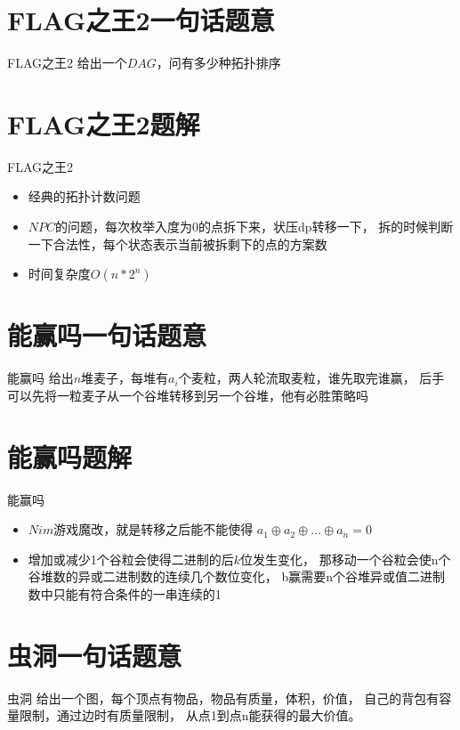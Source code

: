 \documentclass{beamer}
\begin{document}
\section{FLAG之王2一句话题意}
\begin{frame} {FLAG之王2}
  给出一个$DAG$，问有多少种拓扑排序
\end{frame}
\section{FLAG之王2题解}
\begin{frame} {FLAG之王2}
\begin{itemize}
  \item 经典的拓扑计数问题
  \item $NPC$的问题，每次枚举入度为0的点拆下来，状压dp转移一下，
  拆的时候判断一下合法性，每个状态表示当前被拆剩下的点的方案数
  \item 时间复杂度$O(n*2^n)$
\end{itemize}
\end{frame}

\section{能赢吗一句话题意}
\begin{frame} {能赢吗}
  给出$n$堆麦子，每堆有$a_i$个麦粒，两人轮流取麦粒，谁先取完谁赢，
  后手可以先将一粒麦子从一个谷堆转移到另一个谷堆，他有必胜策略吗
\end{frame}
\section{能赢吗题解}
\begin{frame} {能赢吗}
\begin{itemize}
  \item $Nim$游戏魔改，就是转移之后能不能使得
  $a_1 \oplus a_2 \oplus ... \oplus a_n =0$
  \item 增加或减少1个谷粒会使得二进制的后$k$位发生变化，
  那移动一个谷粒会使n个谷堆数的异或二进制数的连续几个数位变化，
  b赢需要n个谷堆异或值二进制数中只能有符合条件的一串连续的1
\end{itemize}
\end{frame}

\section{虫洞一句话题意}
\begin{frame} {虫洞}
  给出一个图，每个顶点有物品，物品有质量，体积，价值，
  自己的背包有容量限制，通过边时有质量限制，
  从点1到点n能获得的最大价值。
\end{frame}
\end{document}
